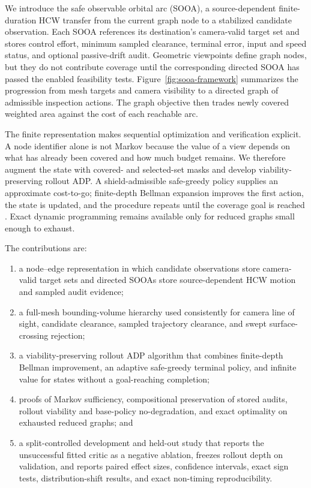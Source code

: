 \documentclass{IEEEtaes}
\theoremstyle{remark}
\theoremstyle{plain}
\begin{document}
We introduce the safe observable orbital arc (SOOA), a source-dependent finite-duration HCW transfer from the current graph node to a stabilized candidate observation. Each SOOA references its destination's camera-valid target set and stores control effort, minimum sampled clearance, terminal error, input and speed status, and optional passive-drift audit. Geometric viewpoints define graph nodes, but they do not contribute coverage until the corresponding directed SOOA has passed the enabled feasibility tests. Figure~\ref{fig:sooa-framework} summarizes the progression from mesh targets and camera visibility to a directed graph of admissible inspection actions. The graph objective then trades newly covered weighted area against the cost of each reachable arc.

The finite representation makes sequential optimization and verification explicit. A node identifier alone is not Markov because the value of a view depends on what has already been covered and how much budget remains. We therefore augment the state with covered- and selected-set masks and develop viability-preserving rollout ADP. A shield-admissible safe-greedy policy supplies an approximate cost-to-go; finite-depth Bellman expansion improves the first action, the state is updated, and the procedure repeats until the coverage goal is reached \cite{bertsekas2020rollout}. Exact dynamic programming remains available only for reduced graphs small enough to exhaust.

The contributions are:
\begin{enumerate}
  \item a node--edge representation in which candidate observations store camera-valid target sets and directed SOOAs store source-dependent HCW motion and sampled audit evidence;
  \item a full-mesh bounding-volume hierarchy used consistently for camera line of sight, candidate clearance, sampled trajectory clearance, and swept surface-crossing rejection;
  \item a viability-preserving rollout ADP algorithm that combines finite-depth Bellman improvement, an adaptive safe-greedy terminal policy, and infinite value for states without a goal-reaching completion;
  \item proofs of Markov sufficiency, compositional preservation of stored audits, rollout viability and base-policy no-degradation, and exact optimality on exhausted reduced graphs; and
  \item a split-controlled development and held-out study that reports the unsuccessful fitted critic as a negative ablation, freezes rollout depth on validation, and reports paired effect sizes, confidence intervals, exact sign tests, distribution-shift results, and exact non-timing reproducibility.
\end{enumerate}
\end{document}
